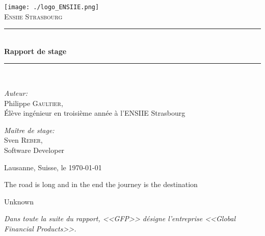 \documentclass[a4paper,french,12pt]{article}
\newcommand{\HRule}{\rule{\linewidth}{0.5mm}}
\begin{document}
\begin{titlepage}
\begin{center}

\texttt{[image: ./logo\_ENSIIE.png]}~\\[1cm]
\textsc{\huge Ensiie Strasbourg}\\[1.5cm]

\HRule \\[0.4cm]
{
	\huge \bfseries Rapport de stage
\\[0.4cm] }
\HRule \\[1.5cm]

\begin{minipage}{0.4\textwidth}
\begin{flushleft} \huge
\emph{Auteur:}\\
Philippe \textsc{Gaultier},\\[0.5cm]
\Large \'Elève ingénieur en troisième année à l'ENSIIE Strasbourg
\end{flushleft}
\end{minipage}
\begin{minipage}{0.4\textwidth}
\begin{flushright} \huge
\emph{Maître de stage:} \\
Sven \textsc{Reber},\\[0.5cm]
\Large Software Developer
\end{flushright}
\end{minipage}

\vfill

{\large Lausanne, Suisse, le \today}



\end{center}
\end{titlepage}

\newpage
{
  \centering
  {
    \vspace{3cm}

    \vspace{3cm}
    \epigraph{The road is long and in the end the journey is the destination}{Unknown}
  }
}
\newpage
\textit{\normalsize Dans toute la suite du rapport, <<GFP>> désigne l'entreprise <<Global Financial Products>>.}
\setlength{\columnseprule}{0.5pt}

\tableofcontents
\listoffigures
\end{document}
